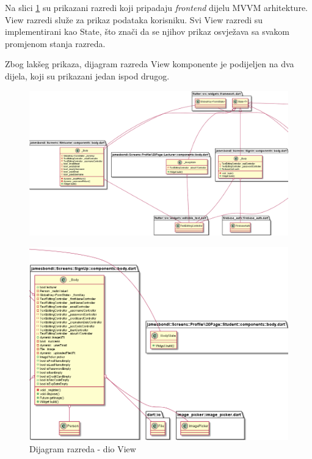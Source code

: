 			Na slici \ref{fig:View2} su prikazani razredi koji pripadaju \textit{frontend} dijelu MVVM arhitekture. View razredi služe za prikaz podataka korisniku. Svi View razredi su implementirani kao State, što znači da se njihov prikaz osvježava sa svakom promjenom stanja razreda.
			
			Zbog lakšeg prikaza, dijagram razreda View komponente je podijeljen na dva dijela, koji su prikazani jedan ispod drugog.
			
			\eject
			\begin{figure}[h]
				\includegraphics[scale=0.41]{dijagrami/View1.PNG}
				\centering
			\end{figure}
			
			\begin{figure}[hbt!]
				\includegraphics[scale=0.47]{dijagrami/View2.PNG}
				\centering
				\caption{Dijagram razreda - dio View}
				\label{fig:View2}
			\end{figure}
			
